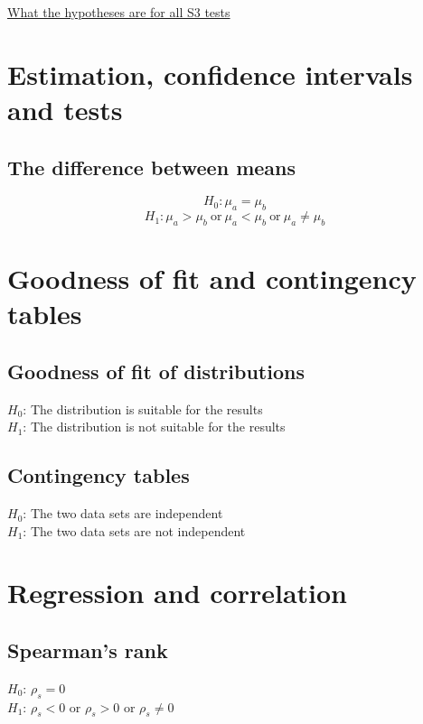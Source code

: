 \documentclass{article}[18pt]
\begin{document}
\begin{center}
\underline{\huge What the hypotheses are for all S3 tests}
\end{center}
\section{Estimation, confidence intervals and tests}
\subsection{The difference between means}
$$H_0:\mu_a=\mu_b$$
$$H_1:\mu_a>\mu_b \ \textrm{or} \ 
\mu_a<\mu_b \  \textrm{or} \ 
\mu_a\neq\mu_b$$
\section{Goodness of fit and contingency tables}
\subsection{Goodness of fit of distributions}
\begin{center}
$H_0$: The distribution is suitable for the results\\
$H_1$: The distribution is not suitable for the results
\end{center}
\subsection{Contingency tables}
\begin{center}
$H_0$: The two data sets are independent\\
$H_1$: The two data sets are not independent
\end{center}
\section{Regression and correlation}
\subsection{Spearman's rank}
\begin{center}
$H_0$: $\rho_s=0$\\
$H_1$: $\rho_s<0$ or $\rho_s>0$ or $\rho_s\neq0$
\end{center}
\end{document}
